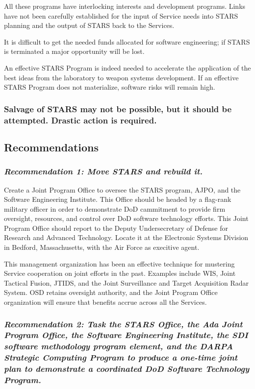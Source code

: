 \documentclass[12pt]{article}
\begin{document}
All these programs have interlocking interests and development programs. Links
have not been carefully established for the input of Service needs into STARS
planning and the output of STARS back to the Services.

It is difficult to get the needed funds allocated for software engineering; if
STARS is terminated a major opportunity will be lost.

An effective STARS Program is indeed needed to accelerate the application of
the best ideas from the laboratory to weapon systems development. If an
effective STARS Program does not materialize, software risks will remain high.

\subsubsection*{Salvage of STARS may not be possible, but it should be attempted. Drastic
action is required.}

\subsection*{Recommendations}

\subsubsection*{\textit{Recommendation 1: Move STARS and rebuild it.}}

Create a Joint Program Office to oversee the STARS program, AJPO, and the
Software Engineering Institute. This Office should be headed by a flag-rank
military officer in order to demonstrate DoD cammitment to provide firm
oversight, resources, and control over DoD software technology efforts. This
Joint Program Office should report to the Deputy Undersecretary of Defense for
Research and Advanced Technology. Locate it at the Electronic Systems Division
in Bedford, Massachusetts, with the Air Force as execitive agent.

This management organization has been an effective technique for mustering
Service cooperation on joint efforts in the past. Examples include WIS, Joint
Tactical Fusion, JTIDS, and the Joint Surveillance and Target Acquisition Radar
System. OSD retains oversight authority, and the Joint Program Office
organization will ensure that benefits accrue across all the Services.

\subsubsection*{\textit{Recommendation 2: Task the STARS Office, the Ada Joint Program Office,
the Software Engineering Institute, the SDI software methodology program
element, and the DARPA Strategic Computing Program to produce a one-time
joint plan to demonstrate a coordinated DoD Software Technology Program.}}
\end{document}

